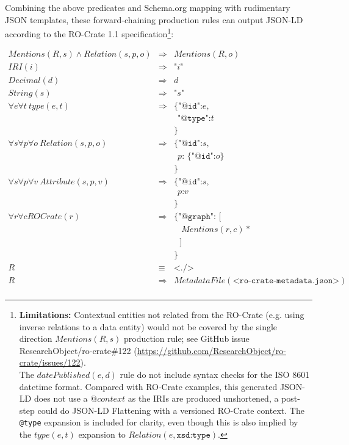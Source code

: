 Combining the above predicates and Schema.org mapping with rudimentary JSON templates, these forward-chaining production rules can output JSON-LD according to the RO-Crate 1.1 specification\footnote{
    \textbf{Limitations:} Contextual entities not related from the RO-Crate (e.g. using inverse relations to a data entity) would not be covered by the single direction $Mentions(R, s)$ production rule; see GitHub issue ResearchObject/ro-crate\#122 (\url{https://github.com/ResearchObject/ro-crate/issues/122}).\\
    The $datePublished(e, d)$ rule do not include syntax checks for the ISO 8601 datetime format. Compared with RO-Crate examples, this generated JSON-LD does not use a $@context$ as the IRIs are produced unshortened, a post-step could do JSON-LD Flattening with a versioned RO-Crate context. The \texttt{@type} expansion is included for clarity, even though this is also implied by the $type(e, t)$ expansion to $Relation(e, \texttt{xsd:type})$.
}:

\small
\begin{eqnarray*}
Mentions(R, s) \land Relation(s,p,o)
                        & \Rightarrow & Mentions(R, o) \\
IRI(i)                  & \Rightarrow & \texttt{"} i \texttt{"} \\
Decimal(d)              & \Rightarrow & d \\
String(s)               & \Rightarrow & \texttt{"} s \texttt{"} \\
\forall e \forall t
\ type(e, t)            & \Rightarrow & \texttt{\{"@id":}  e \texttt{,} \\
&&                               \ \  \texttt{"@type":} t \\
&&                              \texttt{\}} \\
\forall s \forall p \forall o
\ Relation(s,p,o)
                        & \Rightarrow &  \texttt{\{"@id":}  s \texttt{,} \\
&&                               \ \  p \texttt{: \{ "@id":} o \texttt{\}} \\
&&                              \texttt{\}} \\
\forall s \forall p \forall v
\ Attribute(s,p,v)    & \Rightarrow &  \texttt{\{"@id":} s \texttt{,} \\
&&                               \ \ p \texttt{:} v  \\
&&                               \texttt{\}} \\
\forall r  \forall c
    ROCrate(r)      & \Rightarrow &  \texttt{\{ "@graph": [} \\
&& \ \ \ \ Mentions(r, c)* \\
&& \ \ \ \texttt{]} \\
&& \texttt{\}} \\
R   & \equiv & \texttt{<./>}  \\
R   & \Rightarrow &  MetadataFile(\texttt{<ro-crate-metadata.json>}) \\
\end{eqnarray*}
\normalsize

